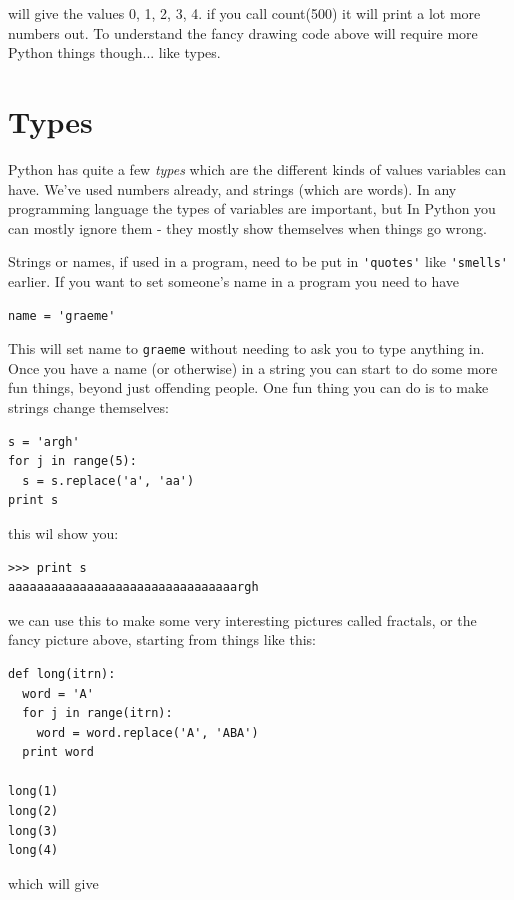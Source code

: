 \documentclass[a4paper, 11pt]{book}
\begin{document}
\noindent
will give the values 0, 1, 2, 3, 4. if you call count(500) it will
print a lot more numbers out. To understand the fancy drawing code
above will require more Python things though... like types.

\section{Types}

Python has quite a few \emph{types} which are the different kinds of
values variables can have. We've used numbers already, and strings
(which are words). In any programming language the types of variables
are important, but In Python you can mostly ignore them - they mostly
show themselves when things go wrong.

Strings or names, if used in a program, need to be put in
\verb|'quotes'| like \verb|'smells'| earlier. If you want to set
someone's name in a program you need to have

{\small
\begin{verbatim}
name = 'graeme'
\end{verbatim}
}

\noindent
This will set name to \verb|graeme| without needing to ask you to type
anything in. Once you have a name (or otherwise) in a string you can
start to do some more fun things, beyond just offending people. One
fun thing you can do is to make strings change themselves:

{\small
\begin{verbatim}
s = 'argh'
for j in range(5):
  s = s.replace('a', 'aa')
print s
\end{verbatim}
}

\noindent
this wil show you:

{\small
\begin{verbatim}
>>> print s
aaaaaaaaaaaaaaaaaaaaaaaaaaaaaaaargh
\end{verbatim}
}

\noindent
we can use this to make some very interesting pictures called
fractals, or the fancy picture above, starting from things like this:

{\small
\begin{verbatim}
def long(itrn):
  word = 'A'
  for j in range(itrn):
    word = word.replace('A', 'ABA')
  print word

long(1)
long(2)
long(3)
long(4)
\end{verbatim}
}

\noindent
which will give
\end{document}
